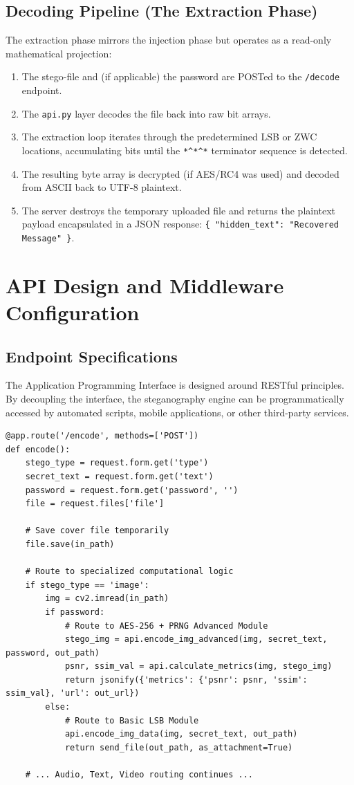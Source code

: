 \documentclass[12pt,a4paper]{report}
\begin{document}
\subsection{Decoding Pipeline (The Extraction Phase)}
The extraction phase mirrors the injection phase but operates as a read-only mathematical projection:
\begin{enumerate}
    \item The stego-file and (if applicable) the password are POSTed to the \texttt{/decode} endpoint.
    \item The \texttt{api.py} layer decodes the file back into raw bit arrays.
    \item The extraction loop iterates through the predetermined LSB or ZWC locations, accumulating bits until the \texttt{*\^{}*\^{}*} terminator sequence is detected.
    \item The resulting byte array is decrypted (if AES/RC4 was used) and decoded from ASCII back to UTF-8 plaintext.
    \item The server destroys the temporary uploaded file and returns the plaintext payload encapsulated in a JSON response: \texttt{\{ "hidden\_text": "Recovered Message" \}}.
\end{enumerate}

\section{API Design and Middleware Configuration}

\subsection{Endpoint Specifications}
The Application Programming Interface is designed around RESTful principles. By decoupling the interface, the steganography engine can be programmatically accessed by automated scripts, mobile applications, or other third-party services.

\begin{lstlisting}[style=pythonstyle, caption={Flask API Routing Architecture}]
@app.route('/encode', methods=['POST'])
def encode():
    stego_type = request.form.get('type')
    secret_text = request.form.get('text')
    password = request.form.get('password', '')
    file = request.files['file']
    
    # Save cover file temporarily
    file.save(in_path)
    
    # Route to specialized computational logic
    if stego_type == 'image':
        img = cv2.imread(in_path)
        if password:
            # Route to AES-256 + PRNG Advanced Module
            stego_img = api.encode_img_advanced(img, secret_text, password, out_path)
            psnr, ssim_val = api.calculate_metrics(img, stego_img)
            return jsonify({'metrics': {'psnr': psnr, 'ssim': ssim_val}, 'url': out_url})
        else:
            # Route to Basic LSB Module
            api.encode_img_data(img, secret_text, out_path)
            return send_file(out_path, as_attachment=True)
            
    # ... Audio, Text, Video routing continues ...
\end{lstlisting}
\end{document}

